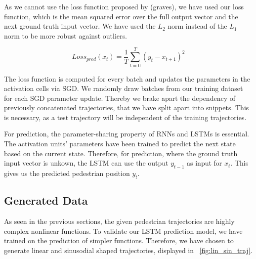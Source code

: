 As we cannot use the loss function proposed by (graves), we have used our loss function, which is the mean squared error over the full output vector and the next ground truth input vector. We have used the $L_2$ norm instead of the $L_1$ norm to be more robust against outliers.

\begin{equation}
Loss_{pred}(x_t) = \frac{1}{T} \sum_{t=0}^{T}(y_t - x_{t+1})^2
\label{eq:loss_pred} 
\end{equation}

The loss function is computed for every batch and updates the parameters in the activation cells via SGD. We randomly draw batches from our training dataset for each SGD parameter update. Thereby we brake apart the dependency of previously concatenated trajectories, that we have split apart into snippets. This is necessary, as a test trajectory will be independent of the training trajectories.

For prediction, the parameter-sharing property of RNNs and LSTMs is essential. The activation units' parameters have been trained to predict the next state based on the current state. Therefore, for prediction, where the ground truth input vector is unkown, the LSTM can use the output $y_{t-1}$ as input for $x_t$. This gives us the predicted pedestrian position $y_t$.

\subsection{Generated Data}
As seen in the previous sections, the given pedestrian trajectories are highly complex nonlinear functions. To validate our LSTM prediction model, we have trained on the prediction of simpler functions. Therefore, we have chosen to generate linear and sinusodial shaped trajectories, displayed in ~\cref{fig:lin_sin_traj}.

